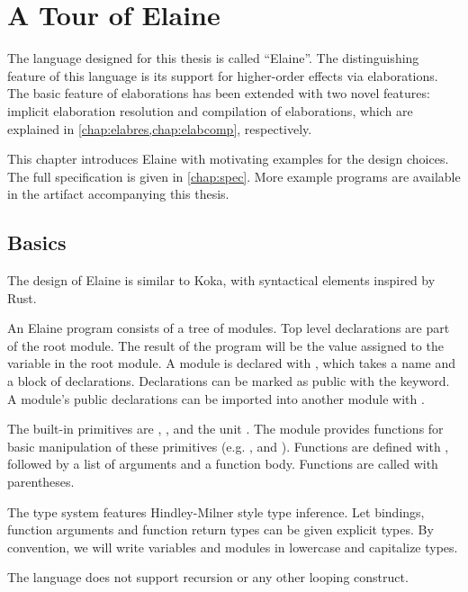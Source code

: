 \chapter{A Tour of Elaine}\label{chap:basics}

The language designed for this thesis is called ``Elaine''. The distinguishing feature of this language is its support for higher-order effects via elaborations. The basic feature of elaborations has been extended with two novel features: implicit elaboration resolution and compilation of elaborations, which are explained in \cref{chap:elabres,chap:elabcomp}, respectively.

This chapter introduces Elaine with motivating examples for the design choices. The full specification is given in \cref{chap:spec}. More example programs are available in the artifact accompanying this thesis.

\section{Basics}

The design of Elaine is similar to Koka, with syntactical elements inspired by Rust. 

An Elaine program consists of a tree of modules. Top level declarations are part of the root module. The result of the program will be the value assigned to the  variable in the root module. A module is declared with , which takes a name and a block of declarations. Declarations can be marked as public with the  keyword. A module's public declarations can be imported into another module with .

The built-in primitives are , ,  and the unit \el{()}. The  module provides functions for basic manipulation of these primitives (e.g. ,  and ). Functions are defined with , followed by a list of arguments and a function body. Functions are called with parentheses.

The type system features Hindley-Milner style type inference. Let bindings, function arguments and function return types can be given explicit types. By convention, we will write variables and modules in lowercase and capitalize types.

The language does not support recursion or any other looping construct.

